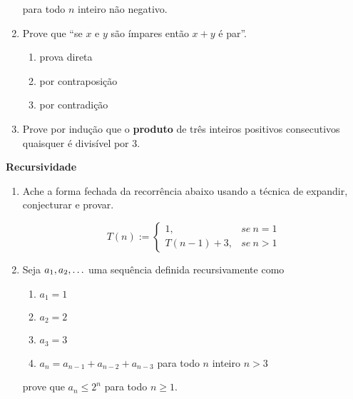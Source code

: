 \documentclass[]{book}
\theoremstyle{definition}
\begin{document}
\begin{enumerate}
\vspace{0.5cm}
para todo $n$ inteiro n\~{a}o negativo.

\item\label{caushw} Prove que ``se $x$ e $y$ s\~{a}o \'{i}mpares ent\~{a}o $x+y$ \'{e} par''.
\begin{enumerate}
\item prova direta
\item por contraposi\c{c}\~{a}o
\item por contradi\c{c}\~{a}o
\end{enumerate}

\item\label{caushw} Prove por indu\c{c}\~{a}o que o \textbf{produto} de tr\^{e}s inteiros positivos consecutivos quaisquer \'{e} divis\'{i}vel por $3$.

\end{enumerate}

\vspace{0.2 cm}


\textbf{Recursividade}

\begin{enumerate}

\item \label{caushw} Ache a forma fechada da recorrência abaixo usando a técnica de expandir, conjecturar e provar.

\begin{equation}
T(n) := \left\{
  \begin{array}{lr}
    1, & se\ n = 1\\
    T(n-1) + 3, & se\ n > 1
  \end{array}
\right.
\end{equation}

\item\label{caushw} Seja $a_{1},a_{2},\ldotp\ldotp\ldotp$ uma sequ\^{e}ncia definida recursivamente como

\begin{enumerate}
\item $a_{1} = 1$
\item $a_{2} = 2$
\item $a_{3} = 3$
\item $a_{n} = a_{n-1} + a_{n-2} + a_{n-3}$ para todo $n$ inteiro $n >3$
\end{enumerate}

prove que $a_{n} \leq 2^{n}$ para todo $n \geq 1$.

\end{enumerate}
\end{document}
